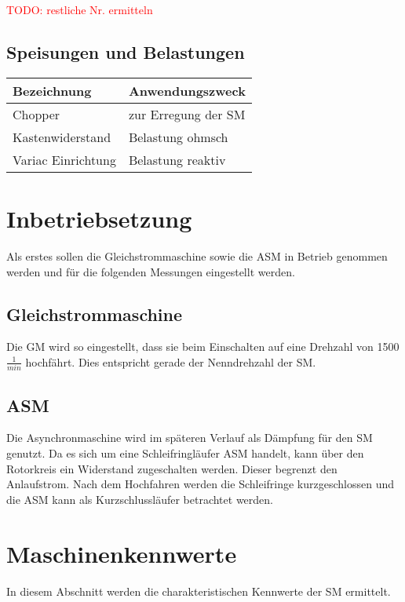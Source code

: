 \begin{flushleft}
\textcolor{red}{TODO: restliche Nr. ermitteln}


\subsection{Speisungen und Belastungen}

\begin{tabular}{|L{0.3 \textwidth}|l|}
 \hline
  \textbf{Bezeichnung} & \textbf{Anwendungszweck}  \\
 \hline
 Chopper  & zur Erregung der SM  \\
\hline
Kastenwiderstand & Belastung ohmsch  \\
\hline
 Variac Einrichtung & Belastung reaktiv  \\
\hline

\end{tabular}



\newpage
\section{Inbetriebsetzung}
Als erstes sollen die Gleichstrommaschine sowie die ASM in Betrieb genommen werden und für die folgenden Messungen eingestellt werden.
\subsection{Gleichstrommaschine}
Die GM wird so eingestellt, dass sie beim Einschalten auf eine Drehzahl von 1500 $\frac{1}{min}$ hochfährt. Dies entspricht gerade der Nenndrehzahl der SM.

\subsection{ASM}
Die Asynchronmaschine wird im späteren Verlauf als Dämpfung für den SM genutzt. 
Da es sich um eine Schleifringläufer ASM handelt, kann über den Rotorkreis ein Widerstand zugeschalten werden. Dieser begrenzt den Anlaufstrom. Nach dem Hochfahren werden die Schleifringe kurzgeschlossen und die ASM kann als Kurzschlussläufer betrachtet werden.


\newpage



\section{Maschinenkennwerte}
In diesem Abschnitt werden die charakteristischen Kennwerte der SM ermittelt.


\end{flushleft}
